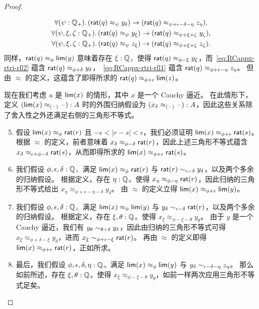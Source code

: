 \begin{proof}
\begin{enumerate}
    \begin{gather}
      \fall{\psi:\Qp}(\rcrat(q) \approx_{\psi} y_\delta) \to (\rcrat(q) \approx_{\psi+\epsilon-\delta-\eta} z_\eta), \label{eq:RCappx-rtri-rll1}\\
      \fall{\psi,\xi,\zeta:\Qp} (\rcrat(q) \approx_{\psi} y_\xi) \to (\rcrat(q) \approx_{\psi+\xi+\zeta} y_\zeta), \label{eq:RCappx-rtri-rll2}\\
      \fall{\psi,\xi,\zeta:\Qp} (\rcrat(q) \approx_{\psi} z_\xi) \to (\rcrat(q) \approx_{\psi+\xi+\zeta} z_\zeta). \label{eq:RCappx-rtri-rll3}
    \end{gather}
    同样，$\mathsf{rat}(q)\approx_\phi \mathsf{lim}(y)$ 意味着存在 $\xi:\mathbb{Q}_{+}$ 使得 $\mathsf{rat}(q) \approx_{\phi-\xi} y_\xi$，而~\eqref{eq:RCappx-rtri-rll2} 蕴含 $\mathsf{rat}(q) \approx_{\phi+\delta} y_\delta$，~\eqref{eq:RCappx-rtri-rll1} 蕴含 $\mathsf{rat}(q) \approx_{\phi+\epsilon-\eta} z_\eta$。
    但由 $\approx$ 的定义，这蕴含了即得所求的 $\mathsf{rat}(q) \approx_{\phi+\epsilon} \mathsf{lim}(z)$。
  \end{enumerate}
  现在我们考虑 $u$ 是 $\mathsf{lim}(x)$ 的情形，其中 $x$ 是一个 Cauchy 逼近。
  在此情形下，定义 $(\mathsf{lim}(x) \approx_{(\mathord{\hspace{1pt}\text{--}\hspace{1pt}})} {\mathord{\hspace{1pt}\text{--}\hspace{1pt}}}) : A$ 时的外围归纳假设为 ${(x_\delta \approx_{(\mathord{\hspace{1pt}\text{--}\hspace{1pt}})} {\mathord{\hspace{1pt}\text{--}\hspace{1pt}}})}: A$，因此这些关系除了舍入性之外还满足右侧的三角形不等式。
  \begin{enumerate}\setcounter{enumi}{4}
  \item 假设 $\mathsf{lim}(x)\approx_\phi \mathsf{rat}(r)$ 且 $-\epsilon<|r-s|<\epsilon$，我们必须证明 $\mathsf{lim}(x)\approx_{\phi+\epsilon} \mathsf{rat}(s)$。
    根据 $\approx$ 的定义，前者意味着 $x_\delta \approx_{\phi-\delta} \mathsf{rat}(r)$，因此上述三角形不等式蕴含 $x_\delta \approx_{\epsilon+\phi-\delta} \mathsf{rat}(s)$，从而即得所求的 $\mathsf{lim}(x)\approx_{\phi+\epsilon} \mathsf{rat}(s)$。
  \item 我们假设 $\phi,\epsilon,\delta:\mathbb{Q}_{+}$ 满足 $\mathsf{lim}(x)\approx_\phi \mathsf{rat}(r)$ 与 $\mathsf{rat}(r) \sim_{\epsilon-\delta} y_\delta$，以及两个多余的归纳假设。
    根据定义，存在 $\eta:\mathbb{Q}_{+}$ 使得 $x_\eta \approx_{\phi-\eta} \mathsf{rat}(r)$，因此归纳的三角形不等式给出 $x_\eta \approx_{\phi+\epsilon-\eta-\delta} y_\delta$。
    由 $\approx$ 的定义立得 $\mathsf{lim}(x) \approx_{\phi+\epsilon} \mathsf{lim}(y)$。
  \item 我们假设 $\phi,\epsilon,\delta:\mathbb{Q}_{+}$ 满足 $\mathsf{lim}(x)\approx_\phi \mathsf{lim}(y)$ 与 $y_\delta \sim_{\epsilon-\delta} \mathsf{rat}(r)$，以及两个多余的归纳假设。
    根据定义，存在 $\xi,\theta:\mathbb{Q}_{+}$ 使得 $x_\xi \approx_{\phi-\xi-\theta} y_\theta$。
    由于 $y$ 是一个 Cauchy 逼近，我们有 $y_\theta \sim_{\theta+\delta} y_\delta$，因此由归纳的三角形不等式可得 $x_\xi \approx_{\phi+\delta-\xi} y_\delta$，进而 $x_\xi \sim_{\phi+\epsilon-\xi} \mathsf{rat}(r)$。
    再由 $\approx$ 的定义即得 $\mathsf{lim}(x) \approx_{\phi+\epsilon}\mathsf{rat}(r)$，正如所求。
  \item 最后，我们假设 $\phi,\epsilon,\delta,\eta:\mathbb{Q}_{+}$ 满足 $\mathsf{lim}(x)\approx_\phi \mathsf{lim}(y)$ 与 $y_\delta \sim_{\epsilon-\delta-\eta} z_\eta$。
    那么如前所述，存在 $\xi,\theta:\mathbb{Q}_{+}$ 使得 $x_\xi \approx_{\phi-\xi-\theta} y_\theta$，如前一样两次应用三角形不等式足矣。
  \end{enumerate}


\end{proof}

